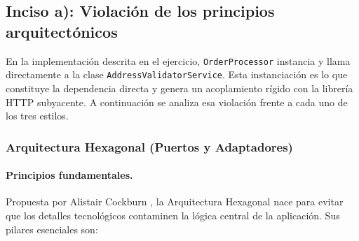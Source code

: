 \subsection{Inciso a): Violación de los principios arquitectónicos}

En la implementación descrita en el ejercicio, \texttt{OrderProcessor} instancia y llama directamente a la clase \texttt{AddressValidatorService}. Esta instanciación es lo que constituye la dependencia directa y genera un acoplamiento rígido con la librería HTTP subyacente. A continuación se analiza esa violación frente a cada uno de los tres estilos.

\subsubsection*{Arquitectura Hexagonal (Puertos y Adaptadores)}

\paragraph{Principios fundamentales.} Propuesta por Alistair Cockburn \parencite{cockburn2005}, la Arquitectura Hexagonal nace para evitar que los detalles tecnológicos contaminen la lógica central de la aplicación. Sus pilares esenciales son:

